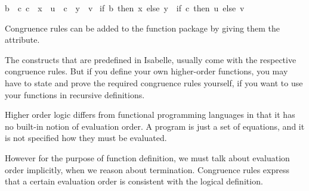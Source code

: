 \begin{isabellebody}
\begin{isamarkuptxt}
  \begin{isabelle}%
{}{}b\ {}\ {}c{}\ {}c\ {}\ {}x\ {}\ {}u{}\ {}\ {}c\ {}\ {}y\ {}\ {}v{}\isanewline
{}\ {}if\ {}b\ then\ {}x\ else\ {}y{}\ {}\ {}if\ {}c\ then\ {}u\ else\ {}v{}%
\end{isabelle}
  
  Congruence rules can be added to the
  function package by giving them the  attribute.

  The constructs that are predefined in Isabelle, usually
  come with the respective congruence rules.
  But if you define your own higher-order functions, you may have to
  state and prove the required congruence rules yourself, if you want to use your
  functions in recursive definitions.%
\end{isamarkuptxt}%
\isamarkuptrue%
%
\endisatagproof
{\isafoldproof}%
%
\isadelimproof
%
\endisadelimproof
%
\isamarkuptrue%
%
\begin{isamarkuptext}%
Higher order logic differs from functional programming languages in
  that it has no built-in notion of evaluation order. A program is
  just a set of equations, and it is not specified how they must be
  evaluated. 

  However for the purpose of function definition, we must talk about
  evaluation order implicitly, when we reason about termination.
  Congruence rules express that a certain evaluation order is
  consistent with the logical definition. 


\end{isamarkuptext}
\end{isabellebody}
